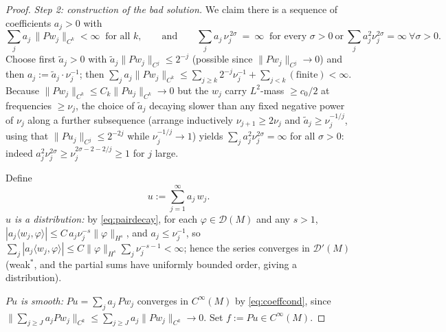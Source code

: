 \documentclass[11pt]{amsart}
\theoremstyle{plain}
\theoremstyle{definition}
\theoremstyle{remark}
\newcommand{\D}{\mathcal{D}}
\newcommand{\DD}{\mathcal{D}'}
\begin{document}
\begin{proof}
\emph{Step 2: construction of the bad solution.}  We claim there is a
sequence of coefficients $a_j>0$ with
\begin{equation}\label{eq:coeffcond}
\sum_j a_j\,\|Pw_j\|_{C^{k}}<\infty\ \text{ for all }k,
\qquad\text{and}\qquad
\sum_j a_j\,\nu_j^{\,2\sigma}\ =\ \infty\ \text{ for every }\sigma>0
\ \text{or}\ \sum_j a_j^2\nu_j^{2\sigma}=\infty\ \forall\sigma>0 .
\end{equation}
Choose first $\tilde a_j>0$ with
$\tilde a_j\|Pw_j\|_{C^{j}}\le 2^{-j}$ (possible since
$\|Pw_j\|_{C^j}\to0$) and then $a_j:=\tilde a_j\cdot\nu_j^{-1}$;
then $\sum_j a_j\|Pw_j\|_{C^k}\le\sum_{j\ge k}2^{-j}\nu_j^{-1}+
\sum_{j<k}(\text{finite})<\infty$.  Because
$\|Pw_j\|_{C^k}\le C_k\|Pu_j\|_{C^k}\to 0$ but the $w_j$ carry
$L^2$-mass $\ge c_0/2$ at frequencies $\ge\nu_j$, the choice of
$\tilde a_j$ decaying slower than any fixed negative power of
$\nu_j$ along a further subsequence (arrange inductively
$\nu_{j+1}\ge 2\nu_j$ and $\tilde a_j\ge \nu_j^{-1/j}$, using that
$\|Pu_j\|_{C^j}\le 2^{-2j}$ while $\nu_j^{-1/j}\to 1$) yields
$\sum_j a_j^2\nu_j^{2\sigma}=\infty$ for all $\sigma>0$: indeed
$a_j^2\nu_j^{2\sigma}\ge \nu_j^{2\sigma-2-2/j}\ge 1$ for
$j$ large.

Define
\[
u:=\sum_{j=1}^\infty a_j\, w_j .
\]
\emph{$u$ is a distribution:} by \eqref{eq:pairdecay}, for each
$\varphi\in\D(M)$ and any $s>1$,
$|a_j\langle w_j,\varphi\rangle|\le C\,a_j\nu_j^{-s}
\|\varphi\|_{H^{s}}$, and $a_j\le\nu_j^{-1}$, so
$\sum_j |a_j\langle w_j,\varphi\rangle|\le
C\|\varphi\|_{H^{s}}\sum_j\nu_j^{-s-1}<\infty$; hence the series
converges in $\DD(M)$ (weak$^{\!*}$, and the partial sums have
uniformly bounded order, giving a distribution).

\emph{$Pu$ is smooth:} $Pu=\sum_j a_j\,Pw_j$ converges in
$C^\infty(M)$ by \eqref{eq:coeffcond}, since
$\|\sum_{j\ge J}a_jPw_j\|_{C^{k}}\le\sum_{j\ge J}
a_j\|Pw_j\|_{C^k}\to0$.  Set $f:=Pu\in C^\infty(M)$.


\end{proof}
\end{document}
